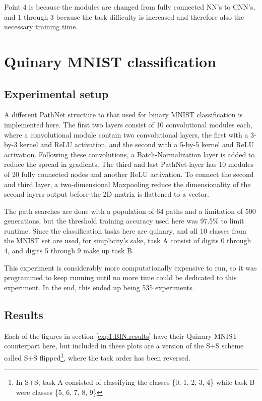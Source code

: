 Point 4 is because the modules are changed from fully connected NN's to CNN's, and 1 through 3 because the task difficulty is increased and therefore also the necessary training time. 

\section{Quinary MNIST classification}
\subsection{Experimental setup}
A different PathNet structure to that used for binary MNIST classification is implemented here. The first two layers consist of 10 convolutional modules each, where a convolutional module contain two convolutional layers, the first with a 3-by-3 kernel and ReLU activation, and the second with a 5-by-5 kernel and ReLU activation. Following these convolutions, a Batch-Normalization layer is added to reduce the spread in gradients. The third and last PathNet-layer has 10 modules of 20 fully connected nodes and another ReLU activation. To connect the second and third layer, a two-dimensional Maxpooling reduce the dimensionality of the second layers output before the 2D matrix is flattened to a vector.   

The path searches are done with a population of 64 paths and a limitation of 500 generations, but the threshold training accuracy used here was 97.5\% to limit runtime. Since the classification tasks here are quinary, and all 10 classes from the MNIST set are used, for simplicity's sake, task A consist of digits 0 through 4, and digits 5 through 9 make up task B. 

This experiment is considerably more computationally expensive to run, so it was programmed to keep running until no more time could be dedicated to this experiment. In the end, this ended up being 535 experiments. 

\subsection{Results}
\label{exp1:results.quinary}
Each of the figures in section \ref{exp1:BIN.results} have their Quinary MNIST counterpart here, but included in these plots are a version of the S+S scheme called S+S flipped\footnote{In S+S, task A consisted of classifying the classes \{0, 1, 2, 3, 4\} while task B were classes \{5, 6, 7, 8, 9\}}, where the task order has been reversed.

